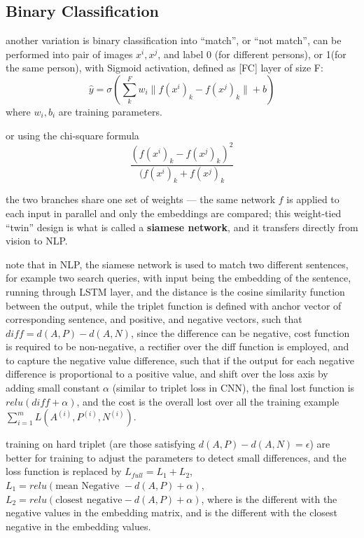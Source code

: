 \documentclass[4apaper,12pt]{book}
\begin{document}
\begin{description}
\begin{description}
      \subsection{Binary Classification}
      \begin{description}
      \item another variation is binary classification into ``match'', or ``not match'', can be performed into pair of images $x^i, x^j$, and label 0 (for different persons), or 1(for the same person), with Sigmoid activation, defined as [FC] layer of size F: $$
        \hat{y}=\sigma (\sum_k^{F} w_i \|f(x^{i})_k - f(x^{j})_k \| + b)
        $$ where $w_i, b_i$ are training parameters.
      \item or using the chi-square formula $$
        \frac{(f(x^i)_k - f(x^j)_k)^2}{(f(x^i)_k + f(x^j)_k}
        $$
      \end{description}
    \item the two branches share one set of weights --- the same network $f$ is applied to each input in parallel and only the embeddings are compared; this weight-tied ``twin'' design is what is called a \textbf{siamese network}, and it transfers directly from vision to NLP.
    \item note that in NLP, the siamese network is used to match two different sentences, for example two search queries, with input being the embedding of the sentence, running through LSTM layer, and the distance is the cosine similarity function between the output, while the triplet function is defined with anchor vector of corresponding sentence, and positive, and negative vectors, such that $diff = d(A,P) - d(A,N)$, since the difference can be negative, cost function is required to be non-negative, a rectifier over the diff function is employed, and to capture the negative value difference, such that if the output for each negative difference is proportional to a positive value, and shift over the loss axis by adding small constant $\alpha$ (similar to triplet loss in CNN), the final lost function is $ relu(diff+\alpha) $, and the cost is the overall lost over all the training example $\sum_{i=1}^mL(A^{(i)},P^{(i)},N^{(i)})$.

    \item training on hard triplet (are those satisfying $d(A,P) - d(A,N) = \epsilon$) are better for training to adjust the parameters to detect small differences, and the loss function is replaced by $L_{full}=L_1+L_2$, $L_1 = relu(\text{mean Negative } - d(A,P) + \alpha)$, $L_2 = relu(\text{closest negative} - d(A,P) + \alpha)$, where  is the different with the negative values in the embedding matrix, and  is the different with the closest negative in the embedding values.
    \end{description}

\end{description}
\end{document}
